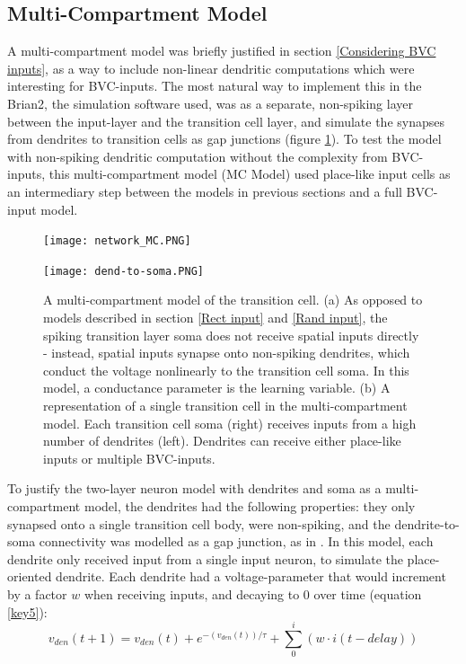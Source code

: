 \documentclass{article}
\begin{document}
    \subsection{Multi-Compartment Model} \label{MC Model}
    A multi-compartment model was briefly justified in section \ref{Considering BVC inputs}, as a way to include non-linear dendritic computations which were interesting for BVC-inputs. The most natural way to implement this in the Brian2, the simulation software used, was as a separate, non-spiking layer between the input-layer and the transition cell layer, and simulate the synapses from dendrites to transition cells as gap junctions (figure \ref{network_MC}). To test the model with non-spiking dendritic computation without the complexity from BVC-inputs, this multi-compartment model (MC Model) used place-like input cells as an intermediary step between the models in previous sections and a full BVC-input model.

    \begin{figure}[h]
        \begin{minipage}[b]{\textwidth}
            \subcaption{}
            \texttt{[image: network\_MC.PNG]}
        \end{minipage}
        \begin{minipage}[t]{0.35\textwidth}
            \subcaption{}
            \texttt{[image: dend-to-soma.PNG]}
        \end{minipage}
        \hspace{0.1\textwidth}
        \begin{minipage}[t]{0.54\textwidth}
            \caption{A multi-compartment model of the transition cell. (a) As opposed to models described in section \ref{Rect input} and \ref{Rand input}, the spiking transition layer soma does not receive spatial inputs directly - instead, spatial inputs synapse onto non-spiking dendrites, which conduct the voltage nonlinearly to the transition cell soma. In this model, a conductance parameter is the learning variable. (b) A representation of a single transition cell in the multi-compartment model. Each transition cell soma (right) receives inputs from a high number of dendrites (left). Dendrites can receive either place-like inputs or multiple BVC-inputs.}
            \label{network_MC}
        \end{minipage}
    \end{figure}

    To justify the two-layer neuron model with dendrites and soma as a multi-compartment model, the dendrites had the following properties: they only synapsed onto a single transition cell body, were non-spiking, and the dendrite-to-soma connectivity was modelled as a gap junction, as in \parencite{Alabi2022}. In this model, each dendrite only received input from a single input neuron, to simulate the place-oriented dendrite. Each dendrite had a voltage-parameter that would increment by a factor \(w\) when receiving inputs, and decaying to 0 over time (equation \ref{key5}):
        \begin{equation}\label{key5} v_{den}(t + 1) = v_{den}(t) + e^{-(v_{den}(t))/\tau} + \sum_{0}^{i} (w \cdot i(t-delay)) \end{equation}
    
\end{document}
